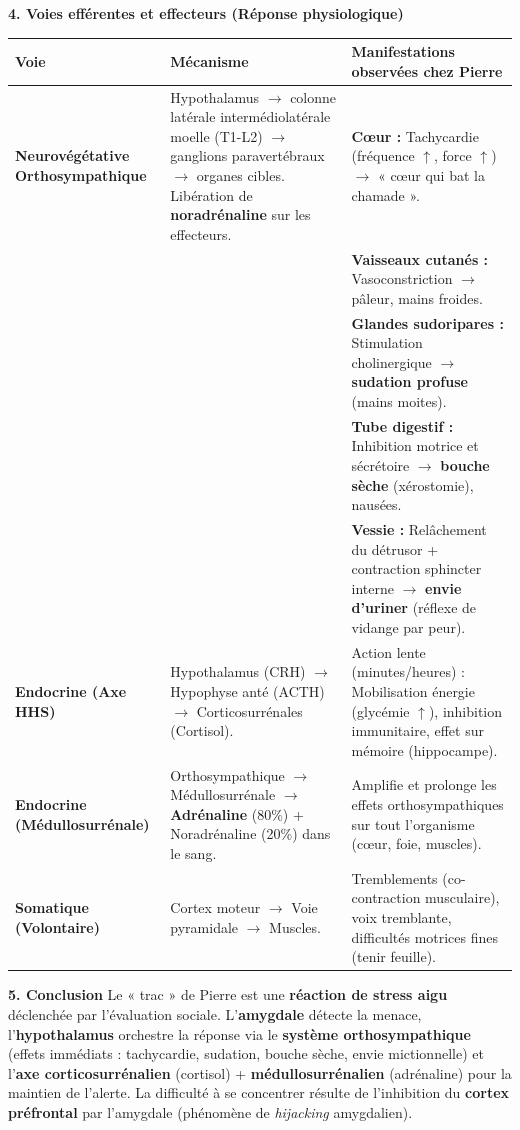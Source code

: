 \documentclass[11pt]{article}
\begin{document}
\begin{exoresolu}
\textbf{4. Voies efférentes et effecteurs (Réponse physiologique)}

\begin{center}
\begin{tabularx}{\linewidth}{|l|X|X|}\hline
\textbf{Voie} & \textbf{Mécanisme} & \textbf{Manifestations observées chez Pierre} \\ \hline
\textbf{Neurovégétative Orthosympathique} & Hypothalamus $\to$ colonne latérale intermédiolatérale moelle (T1-L2) $\to$ ganglions paravertébraux $\to$ organes cibles. Libération de \textbf{noradrénaline} sur les effecteurs. & \textbf{Cœur :} Tachycardie (fréquence $\uparrow$, force $\uparrow$) $\to$ « cœur qui bat la chamade ». \\
& & \textbf{Vaisseaux cutanés :} Vasoconstriction $\to$ pâleur, mains froides. \\
& & \textbf{Glandes sudoripares :} Stimulation cholinergique $\to$ \textbf{sudation profuse} (mains moites). \\
& & \textbf{Tube digestif :} Inhibition motrice et sécrétoire $\to$ \textbf{bouche sèche} (xérostomie), nausées. \\
& & \textbf{Vessie :} Relâchement du détrusor + contraction sphincter interne $\to$ \textbf{envie d'uriner} (réflexe de vidange par peur). \\ \hline
\textbf{Endocrine (Axe HHS)} & Hypothalamus (CRH) $\to$ Hypophyse anté (ACTH) $\to$ Corticosurrénales (Cortisol). & Action lente (minutes/heures) : Mobilisation énergie (glycémie $\uparrow$), inhibition immunitaire, effet sur mémoire (hippocampe). \\ \hline
\textbf{Endocrine (Médullosurrénale)} & Orthosympathique $\to$ Médullosurrénale $\to$ \textbf{Adrénaline} (80\%) + Noradrénaline (20\%) dans le sang. & Amplifie et prolonge les effets orthosympathiques sur tout l'organisme (cœur, foie, muscles). \\ \hline
\textbf{Somatique (Volontaire)} & Cortex moteur $\to$ Voie pyramidale $\to$ Muscles. & Tremblements (co-contraction musculaire), voix tremblante, difficultés motrices fines (tenir feuille). \\ \hline
\end{tabularx}
\end{center}

\textbf{5. Conclusion}
Le « trac » de Pierre est une \textbf{réaction de stress aigu} déclenchée par l'évaluation sociale. L'\textbf{amygdale} détecte la menace, l'\textbf{hypothalamus} orchestre la réponse via le \textbf{système orthosympathique} (effets immédiats : tachycardie, sudation, bouche sèche, envie mictionnelle) et l'\textbf{axe corticosurrénalien} (cortisol) + \textbf{médullosurrénalien} (adrénaline) pour la maintien de l'alerte. La difficulté à se concentrer résulte de l'inhibition du \textbf{cortex préfrontal} par l'amygdale (phénomène de \emph{hijacking} amygdalien).
\end{exoresolu}
\end{document}
